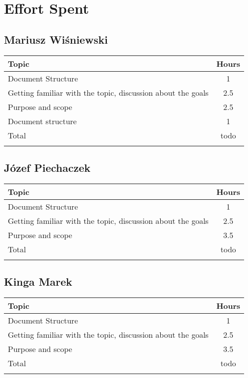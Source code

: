 \chapter{Effort Spent}

\section*{Mariusz Wiśniewski}
\begin{table}[H]
    \centering
    \begin{tabular}{lc} \Xhline{1.5pt}
        Topic &  Hours \\ \hline
        Document Structure & 1 \\ 
        Getting familiar with the topic, discussion about the goals & 2.5 \\ 
        Purpose and scope & 2.5 \\ 
        Document structure & 1 \\ \hline
        Total & todo \\ \Xhline{1.5pt}
    \end{tabular}
\end{table}

\section*{Józef Piechaczek}
\begin{table}[H]
    \centering
    \begin{tabular}{lc} \Xhline{1.5pt}
        Topic &  Hours \\ \hline
        Document Structure & 1 \\ 
        Getting familiar with the topic, discussion about the goals & 2.5 \\ 
        Purpose and scope & 3.5 \\ \hline
        Total &  todo \\ \Xhline{1.5pt}
    \end{tabular}
\end{table}

\section*{Kinga Marek}
\begin{table}[H]
    \centering
    \begin{tabular}{lc} \Xhline{1.5pt}
        Topic &  Hours \\ \hline
        Document Structure & 1 \\ 
        Getting familiar with the topic, discussion about the goals & 2.5 \\ 
        Purpose and scope & 3.5 \\ \hline
        Total &  todo \\ \Xhline{1.5pt}
    \end{tabular}
\end{table}